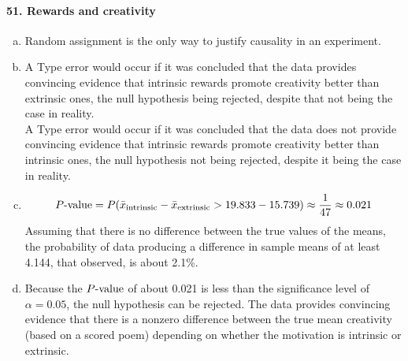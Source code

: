 \documentclass[../Homework]{subfiles}
\begin{document}
		\paragraph{51. Rewards and creativity}
			\begin{enumerate}[a.]
				\item
					Random assignment is the only way to justify causality in an experiment.
				\item
					A Type  error would occur if it was concluded that the data provides convincing evidence that intrinsic rewards promote creativity better than extrinsic ones, the null hypothesis being rejected, despite that not being the case in reality. \\
					A Type  error would occur if it was concluded that the data does not provide convincing evidence that intrinsic rewards promote creativity better than intrinsic ones, the null hypothesis not being rejected, despite it being the case in reality.
				\item
					\[P\text{-value} = P(\bar{x}_{\mathrm{intrinsic}} - \bar{x}_{\mathrm{extrinsic}} > 19.833 - 15.739) \approx \frac{1}{47} \approx 0.021\]
					Assuming that there is no difference between the true values of the means, the probability of data producing a difference in sample means of at least 4.144, that observed, is about 2.1\%.
				\item
					Because the $P\text{-value}$ of about 0.021 is less than the significance level of $\alpha = 0.05$, the null hypothesis can be rejected. The data provides convincing evidence that there is a nonzero difference between the true mean creativity (based on a scored poem) depending on whether the motivation is intrinsic or extrinsic. 
			\end{enumerate}
\end{document}
